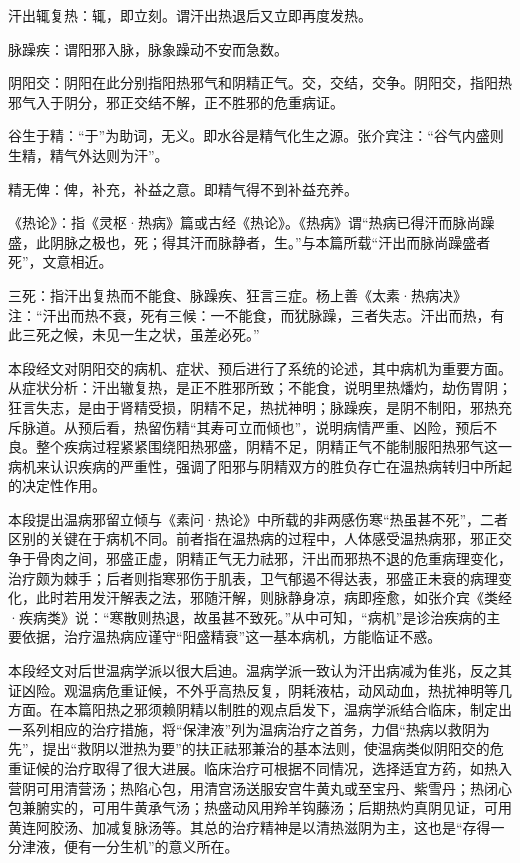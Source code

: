 \documentclass[draft,12pt]{ctexbook}
\begin{document}

\begin{jiaozhu}
  \item 汗出辄复热：辄，即立刻。谓汗出热退后又立即再度发热。
  \item 脉躁疾：谓阳邪入脉，脉象躁动不安而急数。
  \item 阴阳交：阴阳在此分别指阳热邪气和阴精正气。交，交结，交争。阴阳交，指阳热邪气入于阴分，邪正交结不解，正不胜邪的危重病证。
  \item 谷生于精：“于”为助词，无义。即水谷是精气化生之源。张介宾注：“谷气内盛则生精，精气外达则为汗”。
  \item 精无俾：俾，补充，补益之意。即精气得不到补益充养。
  \item 《热论》：指《灵枢·热病》篇或古经《热论》。《热病》谓“热病已得汗而脉尚躁盛，此阴脉之极也，死；得其汗而脉静者，生。”与本篇所载“汗出而脉尚躁盛者死”，文意相近。
  \item 三死：指汗出复热而不能食、脉躁疾、狂言三症。杨上善《太素·热病决》注：“汗出而热不衰，死有三候：一不能食，而犹脉躁，三者失志。汗出而热，有此三死之候，未见一生之状，虽差必死。”
\end{jiaozhu}



本段经文对阴阳交的病机、症状、预后进行了系统的论述，其中病机为重要方面。从症状分析：汗出辙复热，是正不胜邪所致；不能食，说明里热燔灼，劫伤胃阴；狂言失志，是由于肾精受损，阴精不足，热扰神明；脉躁疾，是阴不制阳，邪热充斥脉道。从预后看，热留伤精“其寿可立而倾也”，说明病情严重、凶险，预后不良。整个疾病过程紧紧围绕阳热邪盛，阴精不足，阴精正气不能制服阳热邪气这一病机来认识疾病的严重性，强调了阳邪与阴精双方的胜负存亡在温热病转归中所起的决定性作用。

本段提出温病邪留立倾与《素问·热论》中所载的非两感伤寒“热虽甚不死”，二者区别的关键在于病机不同。前者指在温热病的过程中，人体感受温热病邪，邪正交争于骨肉之间，邪盛正虚，阴精正气无力祛邪，汗出而邪热不退的危重病理变化，治疗颇为棘手；后者则指寒邪伤于肌表，卫气郁遏不得达表，邪盛正未衰的病理变化，此时若用发汗解表之法，邪随汗解，则脉静身凉，病即痊愈，如张介宾《类经·疾病类》说：“寒散则热退，故虽甚不致死。”从中可知，“病机”是诊治疾病的主要依据，治疗温热病应谨守“阳盛精衰”这一基本病机，方能临证不惑。


本段经文对后世温病学派以很大启迪。温病学派一致认为汗出病减为隹兆，反之其证凶险。观温病危重证候，不外乎高热反复，阴耗液枯，动风动血，热扰神明等几方面。在本篇阳热之邪须赖阴精以制胜的观点启发下，温病学派结合临床，制定出一系列相应的治疗措施，将“保津液”列为温病治疗之首务，力倡“热病以救阴为先”，提出“救阴以泄热为要”的扶正祛邪兼治的基本法则，使温病类似阴阳交的危重证候的治疗取得了很大进展。临床治疗可根据不同情况，选择适宜方药，如热入营阴可用清营汤；热陷心包，用清宫汤送服安宫牛黄丸或至宝丹、紫雪丹；热闭心包兼腑实的，可用牛黄承气汤；热盛动风用羚羊钩藤汤；后期热灼真阴见证，可用黄连阿胶汤、加减复脉汤等。其总的治疗精神是以清热滋阴为主，这也是“存得一分津液，便有一分生机”的意义所在。
\end{document}
